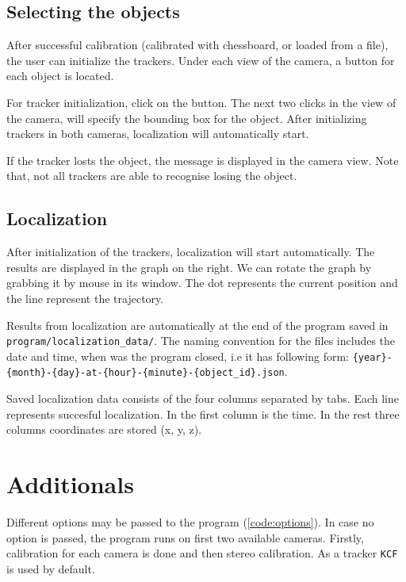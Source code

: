 \subsection{Selecting the objects}
After successful calibration (calibrated with chessboard, or loaded from a
file), the user can initialize the trackers. Under each view of the camera, a button
for each object is located.

For tracker initialization, click on the button. The next two clicks in the
view of the camera, will specify the bounding box for the object. After
initializing trackers in both cameras, localization will automatically start.

If the tracker losts the object, the message is displayed in the camera
view. Note that, not all trackers are able to recognise losing the object.

\subsection{Localization}

After initialization of the trackers, localization will start automatically.
The results are displayed in the graph on the right. We can rotate the graph by
grabbing it by mouse in its window. The dot represents the current position and
the line represent the trajectory.

Results from localization are automatically at the end of the program saved in
\verb+program/localization_data/+. The naming convention for the files includes
the date and time, when was the program closed, i.e it has following form:
\verb+{year}-{month}-{day}-at-{hour}-{minute}-{object_id}.json+.

Saved localization data consists of the four columns separated by tabs. Each
line represents succesful localization. In the first column is the time. In the
rest three columns coordinates are stored (x, y, z).

\section{Additionals}

Different options may be passed to the program (\ref{code:options}). In case no option
is passed, the program runs on first two available cameras. Firstly, calibration for
each camera is done and then stereo calibration. As a tracker \verb+KCF+ is used by default.

\begin{figure}
\lstset{basicstyle=\ttfamily\footnotesize,breaklines=true,frame=lrtb}

\end{figure}

